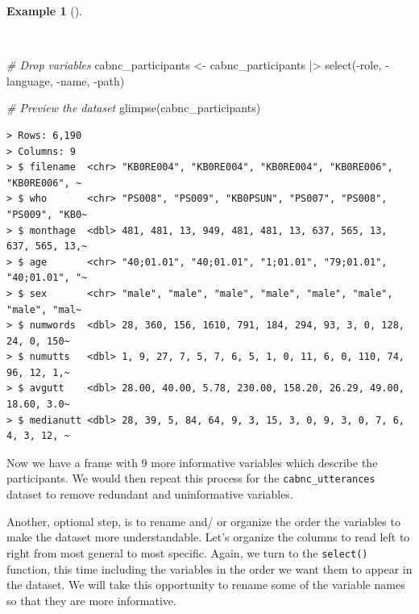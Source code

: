 \documentclass[
  letterpaper,
  DIV=11,
  numbers=noendperiod]{scrreprt}
\newenvironment{Shaded}{\begin{snugshade}}{\end{snugshade}}
\newcommand{\CommentTok}[1]{\textcolor[rgb]{0.00,0.00,0.00}{\textit{#1}}}
\newcommand{\FunctionTok}[1]{\textcolor[rgb]{0.00,0.00,0.00}{#1}}
\newcommand{\NormalTok}[1]{\textcolor[rgb]{0.00,0.00,0.00}{#1}}
\newcommand{\OtherTok}[1]{\textcolor[rgb]{0.00,0.00,0.00}{#1}}
\newcommand{\SpecialCharTok}[1]{\textcolor[rgb]{0.00,0.00,0.00}{#1}}
\theoremstyle{definition}
\newtheorem{example}{Example}[chapter]
\theoremstyle{remark}
\begin{document}
\begin{example}[]\protect\hypertarget{exm-cd-cabnc-drop-vars}{}\label{exm-cd-cabnc-drop-vars}

~

\begin{Shaded}
\begin{Highlighting}[]
\CommentTok{\# Drop variables}
\NormalTok{cabnc\_participants }\OtherTok{\textless{}{-}}
\NormalTok{  cabnc\_participants }\SpecialCharTok{|\textgreater{}}
  \FunctionTok{select}\NormalTok{(}\SpecialCharTok{{-}}\NormalTok{role, }\SpecialCharTok{{-}}\NormalTok{language, }\SpecialCharTok{{-}}\NormalTok{name, }\SpecialCharTok{{-}}\NormalTok{path)}

\CommentTok{\# Preview the dataset}
\FunctionTok{glimpse}\NormalTok{(cabnc\_participants)}
\end{Highlighting}
\end{Shaded}

\begin{verbatim}
> Rows: 6,190
> Columns: 9
> $ filename  <chr> "KB0RE004", "KB0RE004", "KB0RE004", "KB0RE006", "KB0RE006", ~
> $ who       <chr> "PS008", "PS009", "KB0PSUN", "PS007", "PS008", "PS009", "KB0~
> $ monthage  <dbl> 481, 481, 13, 949, 481, 481, 13, 637, 565, 13, 637, 565, 13,~
> $ age       <chr> "40;01.01", "40;01.01", "1;01.01", "79;01.01", "40;01.01", "~
> $ sex       <chr> "male", "male", "male", "male", "male", "male", "male", "mal~
> $ numwords  <dbl> 28, 360, 156, 1610, 791, 184, 294, 93, 3, 0, 128, 24, 0, 150~
> $ numutts   <dbl> 1, 9, 27, 7, 5, 7, 6, 5, 1, 0, 11, 6, 0, 110, 74, 96, 12, 1,~
> $ avgutt    <dbl> 28.00, 40.00, 5.78, 230.00, 158.20, 26.29, 49.00, 18.60, 3.0~
> $ medianutt <dbl> 28, 39, 5, 84, 64, 9, 3, 15, 3, 0, 9, 3, 0, 7, 6, 4, 3, 12, ~
\end{verbatim}

\end{example}

Now we have a frame with 9 more informative variables which describe the
participants. We would then repeat this process for the
\texttt{cabnc\_utterances} dataset to remove redundant and uninformative
variables.

Another, optional step, is to rename and/ or organize the order the
variables to make the dataset more understandable. Let's organize the
columns to read left to right from most general to most specific. Again,
we turn to the \texttt{select()} function, this time including the
variables in the order we want them to appear in the dataset. We will
take this opportunity to rename some of the variable names so that they
are more informative.
\end{document}

